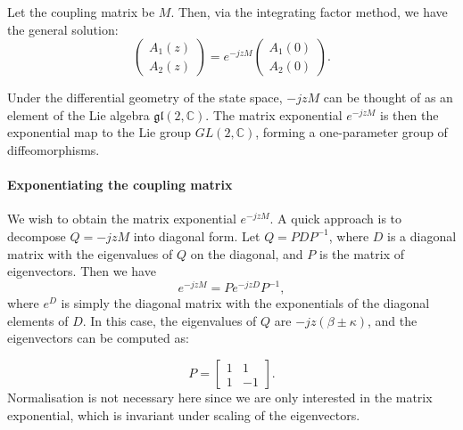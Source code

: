 \documentclass[10pt, a4paper]{article}
\begin{document}
Let the coupling matrix be $M$.
Then, via the integrating factor method, we have the general solution:
\begin{equation}
\begin{pmatrix}
A_1(z)\\
A_2(z)
\end{pmatrix}
=e^{-jzM}
\begin{pmatrix}
A_1(0)\\
A_2(0)
\end{pmatrix}.
\end{equation}

Under the differential geometry of the state space,
$-jzM$ can be thought of as an element of the Lie algebra $\mathfrak{gl}(2,\mathbb{C})$.
The matrix exponential $e^{-jzM}$ is then the exponential map to the Lie group $GL(2,\mathbb{C})$, forming a one-parameter group of diffeomorphisms.

\paragraph{Exponentiating the coupling matrix} We wish to obtain the matrix exponential $e^{-jzM}$.
A quick approach is to decompose $Q=-jzM$ into diagonal form.
Let $Q = PDP^{-1}$, where $D$ is a diagonal matrix with the eigenvalues of $Q$ on the diagonal, and $P$ is the matrix of eigenvectors.
Then we have
\begin{equation}
    e^{-jzM} = Pe^{-jzD}P^{-1},
\end{equation}
where $e^{D}$ is simply the diagonal matrix with the exponentials of the diagonal elements of $D$.
In this case, the eigenvalues of $Q$ are $-jz(\beta \pm \kappa)$, and the eigenvectors can be computed as:

\begin{equation}
P = \begin{bmatrix}
1 & 1 \\
1 & -1
\end{bmatrix}.
\end{equation}
Normalisation is not necessary here since we are only interested in the matrix exponential, which is invariant under scaling of the eigenvectors.
\end{document}
